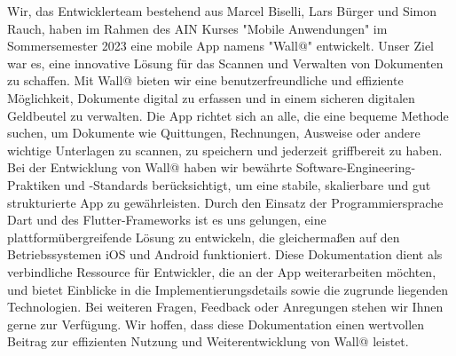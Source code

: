 Wir, das Entwicklerteam bestehend aus Marcel Biselli, Lars Bürger und Simon Rauch, haben im Rahmen des AIN Kurses "Mobile Anwendungen" 
im Sommersemester 2023 eine mobile App namens "Wall@" entwickelt. 
Unser Ziel war es, eine innovative Lösung für das Scannen und Verwalten von Dokumenten zu schaffen.
\newline
\newline
Mit Wall@ bieten wir eine benutzerfreundliche und effiziente Möglichkeit, Dokumente digital zu erfassen und in einem sicheren digitalen Geldbeutel zu verwalten. 
Die App richtet sich an alle, die eine bequeme Methode suchen, um Dokumente wie Quittungen, Rechnungen, Ausweise oder andere wichtige Unterlagen zu scannen, 
zu speichern und jederzeit griffbereit zu haben.
\newline
\newline
Bei der Entwicklung von Wall@ haben wir bewährte Software-Engineering-Praktiken und -Standards berücksichtigt, 
um eine stabile, skalierbare und gut strukturierte App zu gewährleisten. 
Durch den Einsatz der Programmiersprache Dart und des Flutter-Frameworks ist es uns gelungen, eine plattformübergreifende Lösung zu entwickeln, 
die gleichermaßen auf den Betriebssystemen iOS und Android funktioniert.
\newline
\newline
Diese Dokumentation dient als verbindliche Ressource für Entwickler, die an der App weiterarbeiten möchten, 
und bietet Einblicke in die Implementierungsdetails sowie die zugrunde liegenden Technologien.
\newline
\newline
Bei weiteren Fragen, Feedback oder Anregungen stehen wir Ihnen gerne zur Verfügung. 
Wir hoffen, dass diese Dokumentation einen wertvollen Beitrag zur effizienten Nutzung und Weiterentwicklung von Wall@ leistet.